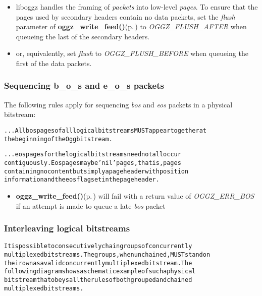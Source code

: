 \begin{itemize}
\item liboggz handles the framing of {\em packets\/} into low-level {\em pages\/}. To ensure that the pages used by secondary headers contain no data packets, set the {\em flush\/} parameter of {\bf oggz\_\-write\_\-feed()}{\rm (p.\,\pageref{group__write__api_ga2})} to {\em OGGZ\_\-FLUSH\_\-AFTER\/} when queueing the last of the secondary headers.\item or, equivalently, set {\em flush\/} to {\em OGGZ\_\-FLUSH\_\-BEFORE\/} when queueing the first of the data packets.\end{itemize}
\subsubsection{Sequencing b\_\-o\_\-s and e\_\-o\_\-s packets}\label{boseosseq}
The following rules apply for sequencing {\em bos\/} and {\em eos\/} packets in a physical bitstream: \small\begin{alltt}
   ... All bos pages of all logical bitstreams MUST appear together at
   the beginning of the Ogg bitstream.\end{alltt}\normalsize 


\small\begin{alltt}   ... eos pages for the logical bitstreams need not all occur
   contiguously.  Eos pages may be 'nil' pages, that is, pages
   containing no content but simply a page header with position
   information and the eos flag set in the page header.
\end{alltt}\normalsize 


\begin{itemize}
\item {\bf oggz\_\-write\_\-feed()}{\rm (p.\,\pageref{group__write__api_ga2})} will fail with a return value of {\em OGGZ\_\-ERR\_\-BOS\/} if an attempt is made to queue a late {\em bos\/} packet\end{itemize}
\subsubsection{Interleaving logical bitstreams}\label{interleaving}
\small\begin{alltt}
   It is possible to consecutively chain groups of concurrently
   multiplexed bitstreams.  The groups, when unchained, MUST stand on
   their own as a valid concurrently multiplexed bitstream.  The
   following diagram shows a schematic example of such a physical
   bitstream that obeys all the rules of both grouped and chained
   multiplexed bitstreams.\end{alltt}\normalsize 


